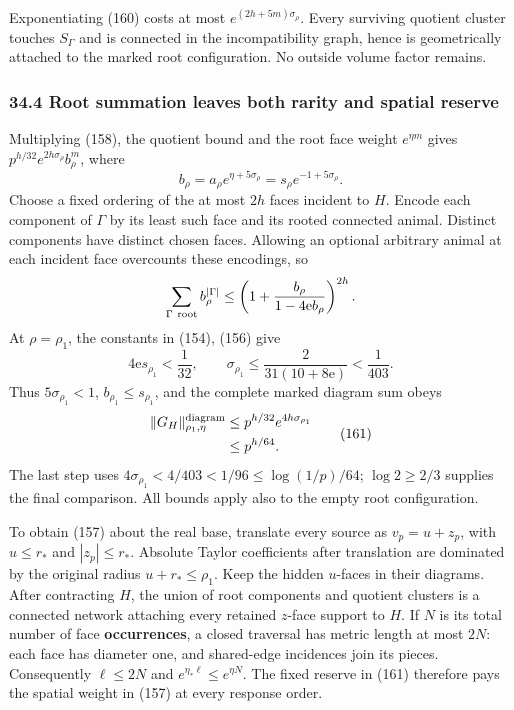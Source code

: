 \documentclass[11pt,a4paper]{article}
\begin{document}
Exponentiating (160) costs at most \(e^{(2h+5m)\sigma_\rho}\). Every
surviving quotient cluster touches \(S_\Gamma\) and is connected in the
incompatibility graph, hence is geometrically attached to the marked
root configuration. No outside volume factor remains.

\hypertarget{root-summation-leaves-both-rarity-and-spatial-reserve}{%
\subsubsection{34.4 Root summation leaves both rarity and spatial
reserve}\label{root-summation-leaves-both-rarity-and-spatial-reserve}}

Multiplying (158), the quotient bound and the root face weight
\(e^{\eta m}\) gives \(p^{h/32}e^{2h\sigma_\rho}b_\rho^m\), where
\[b_\rho=a_\rho e^{\eta+5\sigma_\rho}
          =s_\rho e^{-1+5\sigma_\rho}.\] Choose a fixed ordering of the
at most \(2h\) faces incident to \(H\). Encode each component of
\(\Gamma\) by its least such face and its rooted connected animal.
Distinct components have distinct chosen faces. Allowing an optional
arbitrary animal at each incident face overcounts these encodings, so
\[\sum_{\Gamma\ {\rm root}}b_\rho^{|\Gamma|}
 \le\left(1+\frac{b_\rho}{1-4\mathrm e b_\rho}\right)^{2h}.\] At
\(\rho=\rho_1\), the constants in (154), (156) give
\[4\mathrm e s_{\rho_1}<\frac1{32},\qquad
\sigma_{\rho_1}\le\frac2{31(10+8\mathrm e)}<\frac1{403}.\] Thus
\(5\sigma_{\rho_1}<1\), \(b_{\rho_1}\le s_{\rho_1}\), and the complete
marked diagram sum obeys \[\begin{aligned}
\|G_H\|_{\rho_1,\eta}^{\rm diagram}
 &\le p^{h/32}e^{4h\sigma_{\rho_1}}\\
 &\le p^{h/64}.
\end{aligned}\tag{161}\] The last step uses
\(4\sigma_{\rho_1}<4/403<1/96\le\log(1/p)/64\); \(\log2\ge2/3\) supplies
the final comparison. All bounds apply also to the empty root
configuration.

To obtain (157) about the real base, translate every source as
\(v_p=u+z_p\), with \(u\le r_*\) and \(|z_p|\le r_*\). Absolute Taylor
coefficients after translation are dominated by the original radius
\(u+r_*\le\rho_1\). Keep the hidden \(u\)-faces in their diagrams. After
contracting \(H\), the union of root components and quotient clusters is
a connected network attaching every retained \(z\)-face support to
\(H\). If \(N\) is its total number of face \textbf{occurrences}, a
closed traversal has metric length at most \(2N\): each face has
diameter one, and shared-edge incidences join its pieces. Consequently
\(\ell\le2N\) and \(e^{\eta_*\ell}\le e^{\eta N}\). The fixed reserve in
(161) therefore pays the spatial weight in (157) at every response
order.
\end{document}
